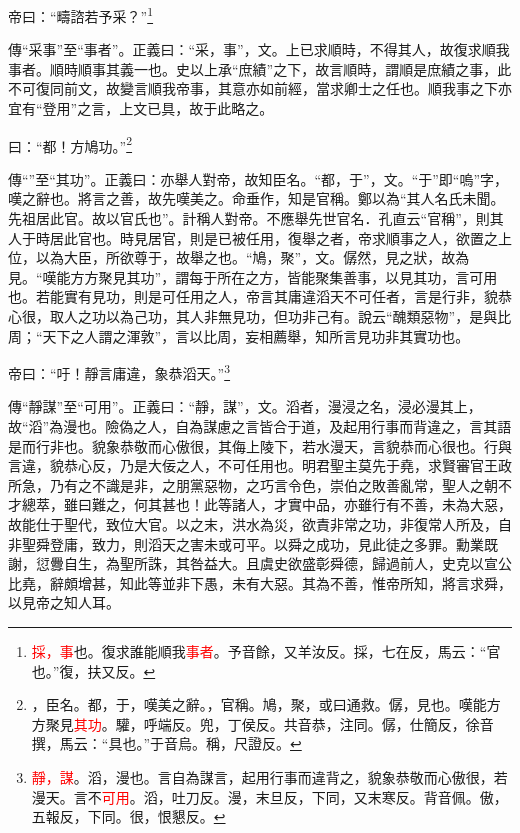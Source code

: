 帝曰：“疇諮若予采？”\footnote{\textcolor{red}{採，事}也。復求誰能順我\textcolor{red}{事者}。予音餘，又羊汝反。採，七在反，馬云：“官也。”復，扶又反。}

{\noindent\zhuan{}\fzbyks 傳“采事”至“事者”。正義曰：“采，事”，文。上已求順時，不得其人，故復求順我事者。順時順事其義一也。史以上承“庶績”之下，故言順時，謂順是庶績之事，此不可復同前文，故變言順我帝事，其意亦如前經，當求卿士之任也。順我事之下亦宜有“登用”之言，上文已具，故于此略之。 \par}

曰：“都！方鳩功。”\footnote{\textcolor{red}{}，臣名。都，于，嘆美之辭。，官稱。鳩，聚，或曰通救。僝，見也。嘆能方方聚見\textcolor{red}{其功}。驩，呼端反。兜，丁侯反。共音恭，注同。僝，仕簡反，徐音撰，馬云：“具也。”于音烏。稱，尺證反。}

{\noindent\zhuan{}\fzbyks 傳“”至“其功”。正義曰：亦舉人對帝，故知臣名。“都，于”，文。“于”即“嗚”字，嘆之辭也。將言之善，故先嘆美之。命垂作，知是官稱。鄭以為“其人名氏未聞。先祖居此官。故以官氏也”。計稱人對帝。不應舉先世官名．孔直云“官稱”，則其人于時居此官也。時見居官，則是已被任用，復舉之者，帝求順事之人，欲置之上位，以為大臣，所欲尊于，故舉之也。“鳩，聚”，文。僝然，見之狀，故為見。“嘆能方方聚見其功”，謂每于所在之方，皆能聚集善事，以見其功，言可用也。若能實有見功，則是可任用之人，帝言其庸違滔天不可任者，言是行非，貌恭心很，取人之功以為己功，其人非無見功，但功非己有。說云“醜類惡物”，是與比周；“天下之人謂之渾敦”，言以比周，妄相薦舉，知所言見功非其實功也。 \par}

帝曰：“吁！靜言庸違，象恭滔天。”\footnote{\textcolor{red}{靜，謀}。滔，漫也。言自為謀言，起用行事而違背之，貌象恭敬而心傲很，若漫天。言不\textcolor{red}{可用}。滔，吐刀反。漫，末旦反，下同，又末寒反。背音佩。傲，五報反，下同。很，恨懇反。}

{\noindent\zhuan{}\fzbyks 傳“靜謀”至“可用”。正義曰：“靜，謀”，文。滔者，漫浸之名，浸必漫其上，故“滔”為漫也。險偽之人，自為謀慮之言皆合于道，及起用行事而背違之，言其語是而行非也。貌象恭敬而心傲很，其侮上陵下，若水漫天，言貌恭而心很也。行與言違，貌恭心反，乃是大佞之人，不可任用也。明君聖主莫先于堯，求賢審官王政所急，乃有之不識是非，之朋黨惡物，之巧言令色，崇伯之敗善亂常，聖人之朝不才總萃，雖曰難之，何其甚也！此等諸人，才實中品，亦雖行有不善，未為大惡，故能仕于聖代，致位大官。以之末，洪水為災，欲責非常之功，非復常人所及，自非聖舜登庸，致力，則滔天之害未或可平。以舜之成功，見此徒之多罪。勳業既謝，愆釁自生，為聖所誅，其咎益大。且虞史欲盛彰舜德，歸過前人，史克以宣公比堯，辭頗增甚，知此等並非下愚，未有大惡。其為不善，惟帝所知，將言求舜，以見帝之知人耳。 \par}

